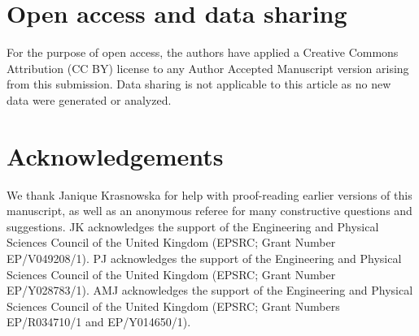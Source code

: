 \documentclass[a4paper,11pt]{article}
\theoremstyle{definition}
\begin{document}
\section*{Open access and data sharing}

For the purpose of open access, the authors have applied a Creative Commons Attribution (CC BY) license to any Author Accepted Manuscript version arising from this submission.
Data sharing is not applicable to this article as no new data were generated or analyzed.

\section*{Acknowledgements}

We thank Janique Krasnowska for help with proof-reading earlier versions of this manuscript, as well as an anonymous referee for many constructive questions and suggestions.
JK acknowledges the support of the Engineering and Physical Sciences Council of the United Kingdom (EPSRC; Grant Number EP/V049208/1).
PJ acknowledges the support of the Engineering and Physical Sciences Council of the United Kingdom (EPSRC; Grant Number EP/Y028783/1).
AMJ acknowledges the support of the Engineering and Physical Sciences Council of the United Kingdom (EPSRC; Grant Numbers EP/R034710/1 and EP/Y014650/1).

  
\end{document}
